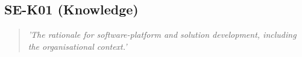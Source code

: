 \subsection{SE-K01 (Knowledge)}

  \begin{quote}
    \textit{'The rationale for software-platform and solution
    development, including the organisational context.'}
  \end{quote}

\newpage
